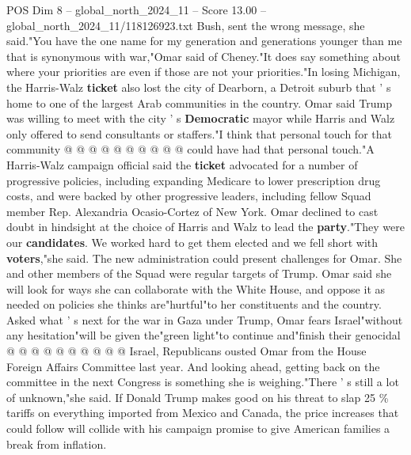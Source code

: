 \begin{textsample}{POS Dim 8 – global\_north\_2024\_11 – Score 13.00 – global\_north\_2024\_11/118126923.txt}
Bush, sent the wrong message, she said."You have the one name for my generation and generations younger than me that is synonymous with war,"Omar said of Cheney."It does say something about where your priorities are even if those are not your priorities."In losing Michigan, the Harris-Walz \textbf{ticket} also lost the city of Dearborn, a Detroit suburb that ' s home to one of the largest Arab communities in the country.
Omar said Trump was willing to meet with the city ' s \textbf{Democratic} mayor while Harris and Walz only offered to send consultants or staffers."I think that personal touch for that community @ @ @ @ @ @ @ @ @ @ could have had that personal touch."A Harris-Walz campaign official said the \textbf{ticket} advocated for a number of progressive policies, including expanding Medicare to lower prescription drug costs, and were backed by other progressive leaders, including fellow Squad member Rep.
Alexandria Ocasio-Cortez of New York.
Omar declined to cast doubt in hindsight at the choice of Harris and Walz to lead the \textbf{party}."They were our \textbf{candidates}.
We worked hard to get them elected and we fell short with \textbf{voters},"she said.
The new administration could present challenges for Omar.
She and other members of the Squad were regular targets of Trump.
Omar said she will look for ways she can collaborate with the White House, and oppose it as needed on policies she thinks are"hurtful"to her constituents and the country.
Asked what ' s next for the war in Gaza under Trump, Omar fears Israel"without any hesitation"will be given the"green light"to continue and"finish their genocidal @ @ @ @ @ @ @ @ @ @ Israel, Republicans ousted Omar from the House Foreign Affairs Committee last year.
And looking ahead, getting back on the committee in the next Congress is something she is weighing."There ' s still a lot of unknown,"she said.
If Donald Trump makes good on his threat to slap 25 \% tariffs on everything imported from Mexico and Canada, the price increases that could follow will collide with his campaign promise to give American families a break from inflation.

\end{textsample}
